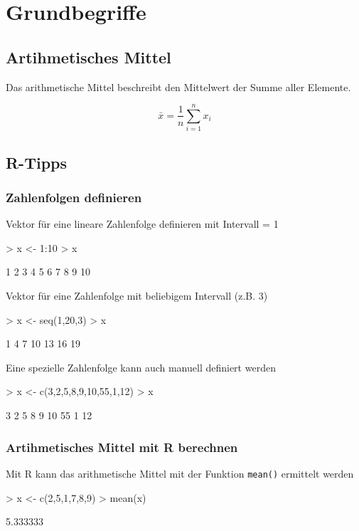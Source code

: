 \section{Grundbegriffe}

\subsection{Artihmetisches Mittel}
Das arithmetische Mittel beschreibt den Mittelwert der Summe aller Elemente.

\[ \bar{x} = \frac{1}{n} \sum\limits_{i=1}^{n} x_i \]

\subsection{R-Tipps}
\subsubsection{Zahlenfolgen definieren}
Vektor für eine lineare Zahlenfolge definieren mit Intervall = 1
\begin{Schunk}
\begin{Sinput}
> x <- 1:10
> x
\end{Sinput}
\begin{Soutput}
 [1]  1  2  3  4  5  6  7  8  9 10
\end{Soutput}
\end{Schunk}
Vektor für eine Zahlenfolge mit beliebigem Intervall (z.B. 3)
\begin{Schunk}
\begin{Sinput}
> x <- seq(1,20,3)
> x
\end{Sinput}
\begin{Soutput}
[1]  1  4  7 10 13 16 19
\end{Soutput}
\end{Schunk}
Eine spezielle Zahlenfolge kann auch manuell definiert werden
\begin{Schunk}
\begin{Sinput}
> x <- c(3,2,5,8,9,10,55,1,12)
> x
\end{Sinput}
\begin{Soutput}
[1]  3  2  5  8  9 10 55  1 12
\end{Soutput}
\end{Schunk}
\subsubsection{Artihmetisches Mittel mit R berechnen}
Mit R kann das arithmetische Mittel mit der Funktion \verb!mean()! 
ermittelt werden
\begin{Schunk}
\begin{Sinput}
> x <- c(2,5,1,7,8,9)
> mean(x)
\end{Sinput}
\begin{Soutput}
[1] 5.333333
\end{Soutput}
\end{Schunk}

